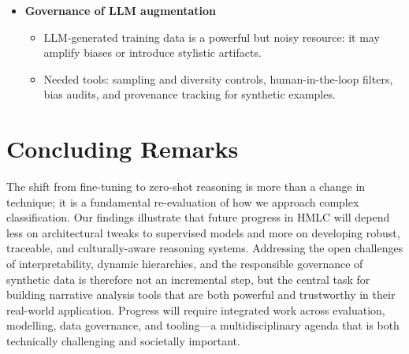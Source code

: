 \begin{itemize}
	\item \textbf{Governance of LLM augmentation}
		\begin{itemize}
			\item LLM-generated training data is a powerful but noisy resource: it may amplify biases or introduce stylistic artifacts.
			\item Needed tools: sampling and diversity controls, human-in-the-loop filters, bias audits, and provenance tracking for synthetic examples.
		\end{itemize}
\end{itemize}

\section{Concluding Remarks}

The shift from fine-tuning to zero-shot reasoning is more than a change in technique; it is a fundamental re-evaluation of how we approach complex classification. Our findings illustrate that future progress in HMLC will depend less on architectural tweaks to supervised models and more on developing robust, traceable, and culturally-aware reasoning systems. Addressing the open challenges of interpretability, dynamic hierarchies, and the responsible governance of synthetic data is therefore not an incremental step, but the central task for building narrative analysis tools that are both powerful and trustworthy in their real-world application. Progress will require integrated work across evaluation, modelling, data governance, and tooling—a multidisciplinary agenda that is both technically challenging and societally important.